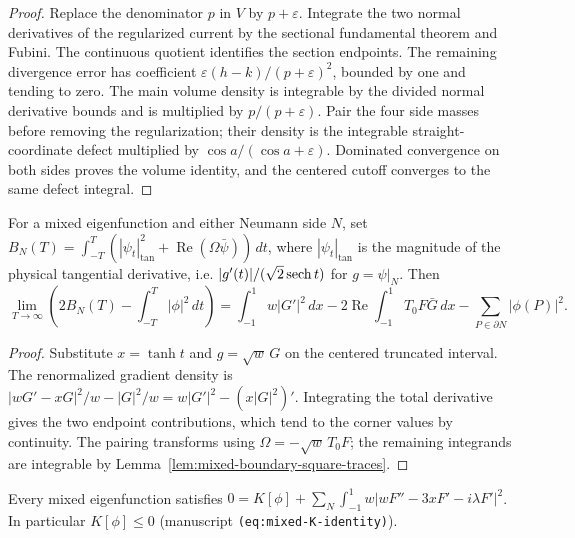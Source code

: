 \begin{proof}
\leanok
Replace the denominator $p$ in $V$ by $p+\varepsilon$. Integrate the
two normal derivatives of the regularized current by the sectional
fundamental theorem and Fubini. The continuous quotient identifies the
section endpoints. The remaining divergence error has coefficient
$\varepsilon(h-k)/(p+\varepsilon)^2$, bounded by one and tending to zero.
The main volume density is integrable by the divided normal derivative
bounds and is multiplied by $p/(p+\varepsilon)$. Pair the four side
masses before removing the regularization; their density is the
integrable straight-coordinate defect multiplied by
$\cos a/(\cos a+\varepsilon)$. Dominated convergence on both sides proves
the volume identity, and the centered cutoff converges to the same defect
integral.
\end{proof}

\begin{lemma}
\label{lem:mixed-neumann-renormalization}
\leanok
For a mixed eigenfunction and either Neumann side $N$, set
$B_N(T)=\int_{-T}^T (|\psi_t|^2_{\mathrm{tan}}+
\operatorname{Re}(\Omega\bar\psi))\,dt$, where
$|\psi_t|_{\mathrm{tan}}$ is the magnitude of the physical tangential
derivative, i.e. $|g'(t)|/(\sqrt2\operatorname{sech} t)$ for $g=\psi|_N$. Then
\[
 \lim_{T\to\infty}\left(2 B_N(T)-\int_{-T}^T|\phi|^2\,dt\right)
 = \int_{-1}^1 w|G'|^2\,dx-2\operatorname{Re}\int_{-1}^1 T_0F\bar G\,dx
   -\sum_{P\in\partial N}|\phi(P)|^2 .
\]
\end{lemma}

\begin{proof}
\leanok
Substitute $x=\tanh t$ and $g=\sqrt w\,G$ on the centered truncated
interval. The renormalized gradient density is
$|wG'-xG|^2/w-|G|^2/w=w|G'|^2-(x|G|^2)'$.
Integrating the total derivative gives the two endpoint contributions,
which tend to the corner values by continuity. The pairing transforms
using $\Omega=-\sqrt w\,T_0F$; the remaining integrands are integrable by
Lemma~\ref{lem:mixed-boundary-square-traces}.
\end{proof}

\begin{lemma}
\label{lem:mixed-K-identity}
\leanok
Every mixed eigenfunction satisfies
$0=K[\phi]+\sum_N\int_{-1}^1w|wF''-3xF'-i\lambda F'|^2$. In particular
$K[\phi]\le0$ (manuscript \texttt{(eq:mixed-K-identity)}).
\end{lemma}

